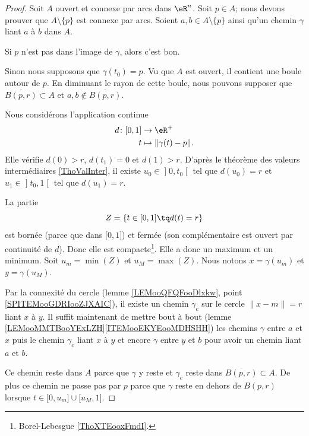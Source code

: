 \begin{proof}
	Soit \( A\) ouvert et connexe par arcs dans \( \eR^n\). Soit \( p\in A\); nous devons prouver que \( A\setminus\{ p \}\) est connexe par arcs. Soient \( a,b\in A\setminus\{ p \}\) ainsi qu'un chemin \( \gamma\) liant \( a\) à \( b\) dans \( A\).

	Si \( p\) n'est pas dans l'image de \( \gamma\), alors c'est bon.

	Sinon nous supposons que \( \gamma(t_0)=p\). Vu que \( A\) est ouvert, il contient une boule autour de \( p\). En diminuant le rayon de cette boule, nous pouvons supposer que \( \overline{B(p,r)}\subset A\) et \( a,b\not\in \overline{B(p,r)}\).

	Nous considérons l'application continue
	\begin{equation}
		\begin{aligned}
			d\colon \mathopen[ 0,1\mathclose] & \to \eR^+                  \\
			t                                 & \mapsto \| \gamma(t)-p \|.
		\end{aligned}
	\end{equation}
	Elle vérifie \( d(0)>r\), \( d(t_1)=0\) et \( d(1)>r\). D'après le théorème des valeurs intermédiaires \ref{ThoValInter}, il existe \( u_0\in\mathopen] 0,t_0\mathclose[\) tel que \( d(u_0)=r\) et \( u_1\in\mathopen] t_0,1\mathclose[\) tel que \( d(u_1)=r\).

	La partie
	\begin{equation}
		Z=\{ t\in\mathopen[ 0,1\mathclose]\tq d(t)=r \}
	\end{equation}
	est bornée (parce que dans \( \mathopen[ 0,1\mathclose]\)) et fermée (son complémentaire est ouvert par continuité de \( d\)). Donc elle est compacte\footnote{Borel-Lebesgue \ref{ThoXTEooxFmdI}.}. Elle a donc un maximum et un minimum. Soit \( u_m=\min(Z)\) et \( u_M=\max(Z)\). Nous notons \( x=\gamma(u_m)\) et \( y=\gamma(u_M)\).

	Par la connexité du cercle (lemme \ref{LEMooQFQFooDlxkw}, point \ref{SPITEMooGDRIooZJXAIC}), il existe un chemin \( \gamma_c\) sur le cercle \( \| x-m \|=r\) liant \( x\) à \( y\). Il suffit maintenant de mettre bout à bout (lemme \ref{LEMooMMTBooYExLZH}\ref{ITEMooEKYEooMDHSHH}) les chemins \( \gamma\) entre \( a\) et \( x\) puis le chemin \( \gamma_c\) liant \( x\) à \( y\) et encore \( \gamma\) entre \( y\) et \( b\) pour avoir un chemin liant \( a\) et \( b\).

	Ce chemin reste dans \( A\) parce que \( \gamma\) y reste et \( \gamma_c\) reste dans \( \overline{B(p,r)}\subset A\). De plus ce chemin ne passe pas par \( p\) parce que \( \gamma\) reste en dehors de \( B(p,r)\) lorsque \( t\in\mathopen[ 0,u_m\mathclose]\cup \mathopen[ u_M,1\mathclose]\).
\end{proof}


